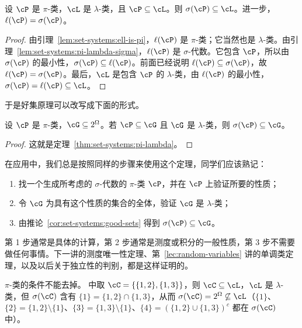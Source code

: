 \begin{theorem}\label{thm:set-systems:pi-lambda}
设 $\cP$ 是 $\pi$-类，$\cL$ 是 $\lambda$-类，且 $\cP\subseteq\cL$。则 $\sigma(\cP)\subseteq\cL$。进一步，$\ell(\cP)=\sigma(\cP)$。
\end{theorem}
\begin{proof}
由引理~\ref{lem:set-systems:ell-is-pi}，$\ell(\cP)$ 是 $\pi$-类；它当然也是 $\lambda$-类。由引理~\ref{lem:set-systems:pi-lambda-sigma}，$\ell(\cP)$ 是 $\sigma$-代数。它包含 $\cP$，所以由 $\sigma(\cP)$ 的最小性，$\sigma(\cP)\subseteq\ell(\cP)$。前面已经说明 $\ell(\cP)\subseteq\sigma(\cP)$，故 $\ell(\cP)=\sigma(\cP)$。最后，$\cL$ 是包含 $\cP$ 的 $\lambda$-类，由 $\ell(\cP)$ 的最小性，$\sigma(\cP)=\ell(\cP)\subseteq\cL$。
\end{proof}

于是好集原理可以改写成下面的形式。

\begin{corollary}\label{cor:set-systems:good-sets}
设 $\cP$ 是 $\pi$-类，$\cG\subseteq2^\Omega$。若 $\cP\subseteq\cG$ 且 $\cG$ 是 $\lambda$-类，则 $\sigma(\cP)\subseteq\cG$。
\end{corollary}
\begin{proof}
这就是定理~\ref{thm:set-systems:pi-lambda}。
\end{proof}

\begin{remark}
在应用中，我们总是按照同样的步骤来使用这个定理，同学们应该熟记：
\begin{enumerate}
\item 找一个生成所考虑的 $\sigma$-代数的 $\pi$-类 $\cP$，并在 $\cP$ 上验证所要的性质；
\item 令 $\cG$ 为具有这个性质的集合的全体，验证 $\cG$ 是 $\lambda$-类；
\item 由推论~\ref{cor:set-systems:good-sets} 得到 $\sigma(\cP)\subseteq\cG$。
\end{enumerate}
第 1 步通常是具体的计算，第 2 步通常是测度或积分的一般性质，第 3 步不需要做任何事情。下一讲的测度唯一性定理、第~\ref{lec:random-variables} 讲的单调类定理，以及以后关于独立性的判别，都是这样证明的。
\end{remark}

\begin{remark}
$\pi$-类的条件不能去掉。 中取 $\cC=\{\{1,2\},\{1,3\}\}$，则 $\cC\subseteq\cL$，$\cL$ 是 $\lambda$-类，但 $\sigma(\cC)$ 含有 $\{1\}=\{1,2\}\cap\{1,3\}$，从而 $\sigma(\cC)=2^\Omega\not\subseteq\cL$（$\{1\}$、$\{2\}=\{1,2\}\setminus\{1\}$、$\{3\}=\{1,3\}\setminus\{1\}$、$\{4\}=(\{1,2\}\cup\{1,3\})^c$ 都在 $\sigma(\cC)$ 中）。
\end{remark}

